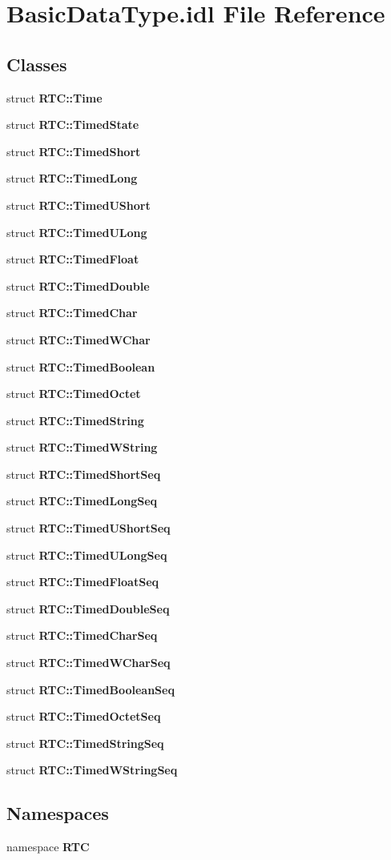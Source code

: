 \section{BasicDataType.idl File Reference}
\label{BasicDataType_8idl}
\subsection*{Classes}
\begin{DoxyCompactItemize}
\item 
struct {\bf RTC::Time}
\item 
struct {\bf RTC::TimedState}
\item 
struct {\bf RTC::TimedShort}
\item 
struct {\bf RTC::TimedLong}
\item 
struct {\bf RTC::TimedUShort}
\item 
struct {\bf RTC::TimedULong}
\item 
struct {\bf RTC::TimedFloat}
\item 
struct {\bf RTC::TimedDouble}
\item 
struct {\bf RTC::TimedChar}
\item 
struct {\bf RTC::TimedWChar}
\item 
struct {\bf RTC::TimedBoolean}
\item 
struct {\bf RTC::TimedOctet}
\item 
struct {\bf RTC::TimedString}
\item 
struct {\bf RTC::TimedWString}
\item 
struct {\bf RTC::TimedShortSeq}
\item 
struct {\bf RTC::TimedLongSeq}
\item 
struct {\bf RTC::TimedUShortSeq}
\item 
struct {\bf RTC::TimedULongSeq}
\item 
struct {\bf RTC::TimedFloatSeq}
\item 
struct {\bf RTC::TimedDoubleSeq}
\item 
struct {\bf RTC::TimedCharSeq}
\item 
struct {\bf RTC::TimedWCharSeq}
\item 
struct {\bf RTC::TimedBooleanSeq}
\item 
struct {\bf RTC::TimedOctetSeq}
\item 
struct {\bf RTC::TimedStringSeq}
\item 
struct {\bf RTC::TimedWStringSeq}
\end{DoxyCompactItemize}
\subsection*{Namespaces}
\begin{DoxyCompactItemize}
\item 
namespace {\bf RTC}
\end{DoxyCompactItemize}
